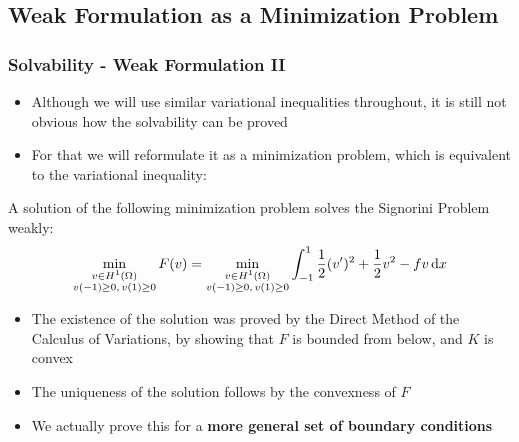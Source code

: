 \subsection{Weak Formulation as a Minimization Problem}
\begin{frame}
	\frametitle{Solvability - Weak Formulation II}
	\begin{itemize}
		\item Although we will use similar variational inequalities throughout, it is still not obvious how the solvability can be proved
		\item For that we will reformulate it as a minimization problem, which is equivalent to the variational inequality:
	\end{itemize}

\begin{theorem}
	A solution of the following minimization problem solves the Signorini Problem weakly:
	\begin{equation}
		\min_{\substack{v \in H^1(\Omega) \\ v(-1) \geq 0,\, v(1) \geq 0}} F(v) = \min_{\substack{v \in H^1(\Omega) \\ v(-1) \geq 0,\, v(1) \geq 0}} \int_{-1}^1{\frac{1}{2} (v')^2 + \frac{1}{2} v^2 - fv \dif x} 
	\end{equation}
\end{theorem}

\begin{itemize}
	\item The existence of the solution was proved by the Direct Method of the Calculus of Variations, by showing that $F$ is bounded from below, and $K$ is convex
	\item The uniqueness of the solution follows by the convexness of $F$
	\item We actually prove this for a \textbf{more general set of boundary conditions}
\end{itemize}
\end{frame}

